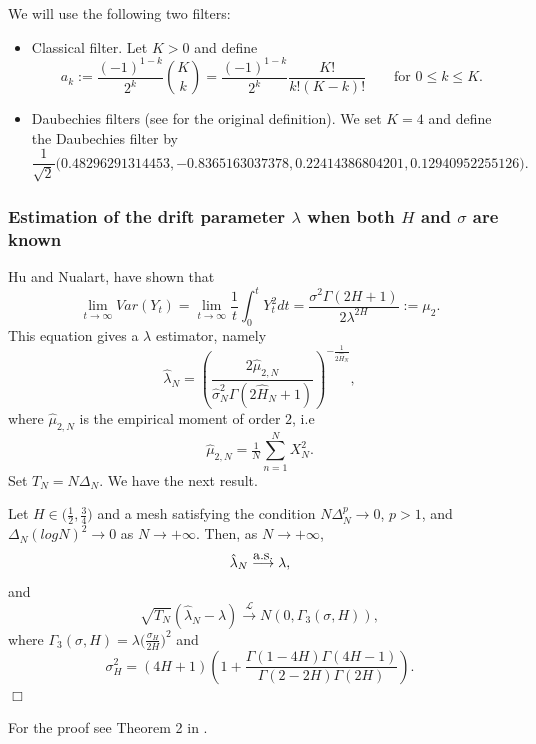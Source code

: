 \documentclass[smallextended]{svjour3}
\begin{document}
We will use the following two filters:
\begin{itemize}
    \item Classical filter. Let $K>0$ and define
    \begin{equation*}
    a_k:= \frac{(-1)^{1-k}}{2^k} {K\choose k} =\frac{(-1)^{1-k}}{2^k}
    \frac{K!}{k!(K-k)!}\qquad \mbox{for }  0\le k\le K.
    \end{equation*}


    \item Daubechies filters (see \cite{de} for the original definition). We
    set $K=4$ and define the Daubechies filter by
    \begin{equation*}
    \frac{1}{\sqrt{2}} \big(0.48296291314453, -0.8365163037378,
    0.22414386804201, 0.12940952255126\big).
    \end{equation*}

\end{itemize}

\subsubsection{Estimation of the drift parameter $\lambda$ when both $H$ and
$\sigma$ are known}

Hu and Nualart, \cite{hu-nu} have shown that
\[
\lim_{t\rightarrow \infty} Var (Y_t)= \lim_{t\rightarrow \infty}
\frac{1}{t}\int_0^t Y_t^2 dt = \frac{\sigma^2 \Gamma(2H+1) }
{2\lambda^{2H}}:=\mu_2.
\]
This equation gives a $\lambda$ estimator, namely
\begin{equation}
\hat{\lambda}_N = \left(\frac{2\hat{\mu}_{2,N}}{\hat{\sigma}_N^2
\Gamma(2\hat{H}_N+1) }  \right)^{-\tfrac{1}{2\hat{H}_N}},\label{est3}
\end{equation}
where $\hat{\mu}_{2,N}$ is the empirical moment of order $2$, i.e
\[
\hat{\mu}_{2,N} =\tfrac{1}{N}\sum_{n=1}^N X_N^2.
\]
Set $T_N=N\Delta_N$. We have the next result.
\begin{theorem}
    Let $H \in \big(\tfrac{1}{2} , \tfrac{3}{4}\big)$ and a mesh satisfying the
    condition $N \Delta_N^p\rightarrow 0$, $p>1$,
    and $ \Delta_N (log N )^2 \rightarrow 0$ as $N \rightarrow +\infty$. Then,
    as $N \rightarrow +\infty$,
    \[
    \hat{\lambda}_N \stackrel{\hbox{\rm a.s.}}{\longrightarrow}  \lambda,
    \]
    and
    \[
    \sqrt{T_N} ( \hat{\lambda}_N -\lambda)
    \stackrel{\mathcal{L}}{\longrightarrow} N (0, \Gamma_3 (\sigma,H)),
    \]
    where $\Gamma_3 (\sigma,H)=\lambda \big(\tfrac{\sigma_H}{2H} \big)^2$ and
    \[
    \sigma_H^2= (4H+1)\left(1+\frac{\Gamma(1-4H)\Gamma(4H-1)
    }{\Gamma(2-2H)\Gamma(2H)} \right).
    \]
    \hfill$\Box$
\end{theorem}
For the proof see Theorem 2 in \cite{br-ia}.
\end{document}
